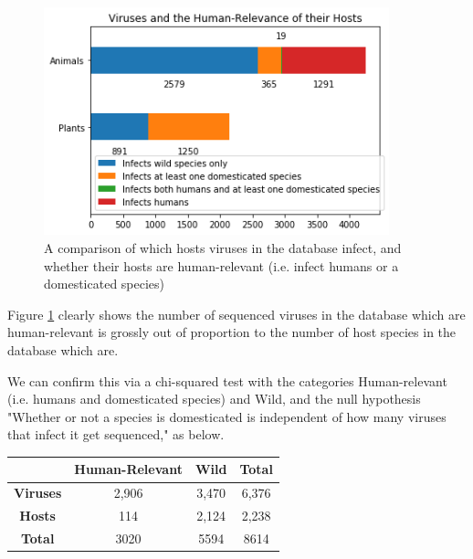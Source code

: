 \documentclass[12pt]{article}
\begin{document}
    \begin{figure}[H]
        \begin{center}
            \includegraphics[width=100mm]{viruses_human_relevance.png}
            \caption{A comparison of which hosts viruses in the database
            infect, and whether their hosts are human-relevant (i.e. infect
            humans or a domesticated species)}
            \label{viruses_human_relevance_figure}
        \end{center}
    \end{figure}

    Figure \ref{viruses_human_relevance_figure} clearly shows the number of
    sequenced viruses in the database which are human-relevant is grossly out
    of proportion to the number of host species in the database which are.

    We can confirm this via a chi-squared test with the categories Human-relevant
    (i.e. humans and domesticated species) and Wild, and the null hypothesis
    "Whether or not a species is domesticated is independent of how many viruses
    that infect it get sequenced," as below.

    \begin{table}[H]
        \begin{tabular}{|c|c|c|c|}
        \hline
                         & \textbf{Human-Relevant} & \textbf{Wild} & \textbf{Total} \\ \hline
        \textbf{Viruses} & 2,906                   & 3,470         & 6,376          \\ \hline
        \textbf{Hosts}   & 114                     & 2,124         & 2,238          \\ \hline
        \textbf{Total}   & 3020                    & 5594          & 8614           \\ \hline
        \end{tabular}
    \end{table}
\end{document}
